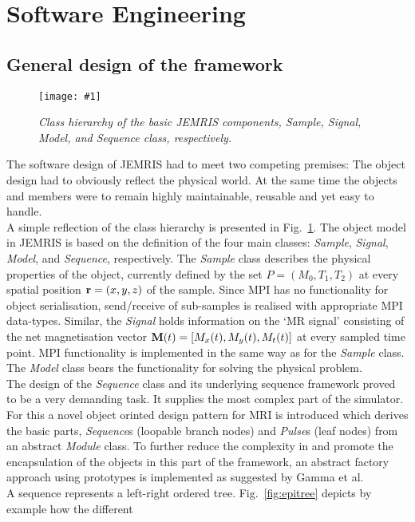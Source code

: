 \documentclass{nic-series}
\newcommand{\epsfigure}[5]{
 \begin{figure}[#4!]
   \begin{center}
    \texttt{[image: \#1]}
    \caption{{\sl #2}\label{#3}}
   \end{center}
 \end{figure}}
\begin{document}
\section{Software Engineering}
\subsection{General design of the framework}
\epsfigure{fig/jemris-classes.eps}{Class hierarchy of the basic JEMRIS components, Sample, Signal, Model, and Sequence class,
                            respectively.}{fig:classes}{bp}{1.0}
The software design of JEMRIS had to meet two competing
premises: The object design had to obviously reflect the physical
world. At the same time the objects and members were to remain highly
maintainable, reusable and yet easy to handle.
\\
A simple reflection of the class hierarchy is presented in
Fig.~\ref{fig:classes}. The object
model in JEMRIS is based on the definition of the four main
classes: {\it Sample}, {\it Signal}, {\it Model}, and {\it Sequence},
respectively. The {\it Sample} class describes the physical properties
of the object, currently defined by the set $P=(M_0,T_1,T_2)$ at every
spatial position ${\bf r}=(x,y,z)$ of the sample. Since MPI has no
functionality for object serialisation, send/receive of sub-samples is
realised with appropriate MPI data-types. Similar, the {\it Signal}
holds information on the `MR signal' consisting of the net
magnetisation vector ${\bf M}(t)=[M_x(t),M_y(t),M_t(t)]$ at every
sampled time point. MPI functionality is implemented in the same way
as for the {\it Sample} class. The {\it Model} class bears the
functionality for solving the physical problem. 
\\
The design of the {\it Sequence} class and its underlying
sequence framework proved to be a very demanding task. It supplies
the most complex part of the simulator. For this a novel object
orinted design pattern for MRI is introduced which derives the basic
parts, {\it Sequence}s (loopable branch nodes) and {\it Pulse}s (leaf
nodes) from an abstract {\it Module} class. To further reduce the complexity in and
promote the encapsulation of the objects in this part of the framework,
an abstract factory approach using prototypes is implemented as suggested by
Gamma et al\cite{gamma}. 
\\
A sequence represents a left-right ordered tree. Fig.~\ref{fig:epitree} depicts by example how the different
\end{document}
